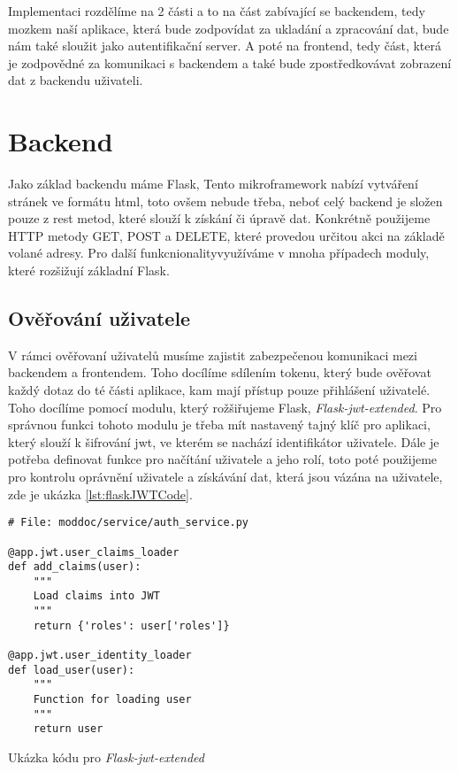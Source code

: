 Implementaci rozdělíme na 2 části a to na část zabívající se backendem, tedy mozkem naší aplikace, která bude zodpovídat
za ukladání a zpracování dat, bude nám také sloužit jako autentifikační server. A poté na frontend, tedy část, která
je zodpovědné za komunikaci s backendem a také bude zpostředkovávat zobrazení dat z backendu uživateli.

\section{Backend}

Jako základ backendu máme Flask,  \cite{flaskDoc}
Tento mikroframework nabízí vytváření stránek ve formátu \gls{html}, toto ovšem nebude třeba, \mbox{neboť} celý backend je složen pouze z \gls{rest} metod,
které slouží k získání či úpravě dat. Konkrétně použijeme HTTP metody GET, POST a DELETE, které provedou určitou akci na základě volané adresy.
Pro další funkcnionality\linebreak využíváme v mnoha případech moduly, které rozšižují základní Flask.

\subsection{Ověřování uživatele}

V rámci ověřovaní uživatelů musíme zajistit zabezpečenou komunikaci mezi backendem a frontendem. Toho docílíme sdílením tokenu, který bude ověřovat
každý dotaz do té části aplikace, kam mají přístup pouze přihlášení uživatelé. Toho docílíme pomocí modulu, který rožšiřujeme Flask,
\textit{Flask-jwt-extended}. Pro správnou funkci tohoto modulu je třeba mít nastavený tajný klíč pro aplikaci, který slouží k šifrování \gls{jwt},
ve kterém se nachází identifikátor uživatele. Dále je potřeba definovat funkce pro načítání uživatele a jeho rolí, toto poté použijeme pro kontrolu
oprávnění uživatele a získávání dat, která jsou vázána na uživatele, zde je ukázka \ref{lst:flaskJWTCode}.

\begin{listing}
    \begin{verbatim}
# File: moddoc/service/auth_service.py

@app.jwt.user_claims_loader
def add_claims(user):
    """
    Load claims into JWT
    """
    return {'roles': user['roles']}

@app.jwt.user_identity_loader
def load_user(user):
    """
    Function for loading user
    """
    return user
    \end{verbatim}
    \caption{Ukázka kódu pro \textit{Flask-jwt-extended}}
    \label{lst:flaskJWTCode}
\end{listing}

